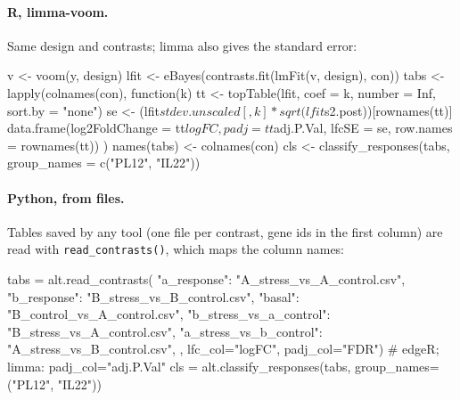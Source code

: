 \documentclass[11pt,a4paper]{article}
\newcommand{\code}[1]{\texttt{\color{navy!85!black}#1}}
\begin{document}

\paragraph{R, limma-voom.} Same design and contrasts; limma also gives the standard error:

\begin{rcode}
v <- voom(y, design)
lfit <- eBayes(contrasts.fit(lmFit(v, design), con))
tabs <- lapply(colnames(con), function(k) {
  tt <- topTable(lfit, coef = k, number = Inf, sort.by = "none")
  se <- (lfit$stdev.unscaled[, k] * sqrt(lfit$s2.post))[rownames(tt)]
  data.frame(log2FoldChange = tt$logFC, padj = tt$adj.P.Val, lfcSE = se,
             row.names = rownames(tt))
})
names(tabs) <- colnames(con)
cls <- classify_responses(tabs, group_names = c("PL12", "IL22"))
\end{rcode}

\paragraph{Python, from files.} Tables saved by any tool (one file per contrast, gene ids in the first
column) are read with \code{read\_contrasts()}, which maps the column names:

\begin{pycode}
tabs = alt.read_contrasts({
    "a_response":            "A_stress_vs_A_control.csv",
    "b_response":            "B_stress_vs_B_control.csv",
    "basal":                 "B_control_vs_A_control.csv",
    "b_stress_vs_a_control": "B_stress_vs_A_control.csv",
    "a_stress_vs_b_control": "A_stress_vs_B_control.csv",
}, lfc_col="logFC", padj_col="FDR")            # edgeR; limma: padj_col="adj.P.Val"
cls = alt.classify_responses(tabs, group_names=("PL12", "IL22"))
\end{pycode}
\end{document}
